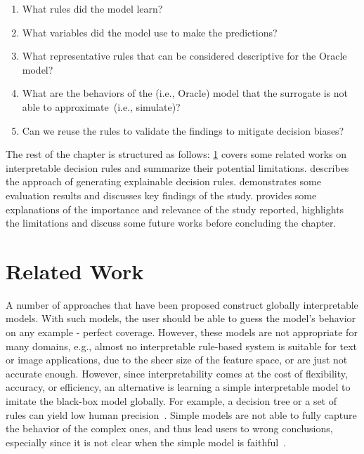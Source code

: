 \begin{enumerate}[noitemsep]
    \item What rules did the model learn?
    \item What variables did the model use to make the predictions?
    \item What representative rules that can be considered descriptive for the Oracle model?
    \item What are the behaviors of the (i.e., Oracle) model that the surrogate is not able to approximate~(i.e., simulate)?
    \item Can we reuse the rules to validate the findings to mitigate decision biases? 
\end{enumerate}

\hspace*{3.5mm} The rest of the chapter is structured as follows: \cref{chapter_7:rw} covers some related works on interpretable decision rules and summarize their potential limitations.  describes the approach of generating explainable decision rules.  demonstrates some evaluation results and discusses key findings of the study.  provides some explanations of the importance and relevance of the study reported, highlights the limitations and discuss some future works before concluding the chapter.  

\section{Related Work} \label{chapter_7:rw}
A number of approaches that have been proposed construct globally interpretable models. With such models, the user should be able to guess the model’s behavior on any example - perfect coverage. However, these models are not appropriate for many domains, e.g., almost no interpretable rule-based system is suitable for text or image applications, due to the sheer size of the feature space, or are just not accurate enough. However, since interpretability comes at the cost of flexibility, accuracy, or efficiency, an alternative is learning a simple interpretable model to imitate the black-box model globally. For example, a decision tree or a set of rules can yield low human precision~\cite{molnar2019interpretable}. Simple models are not able to fully capture the behavior of the complex ones, and thus lead users to wrong conclusions, especially since it is not clear when the simple model is faithful~\cite{bhatt2020explainable}. 

